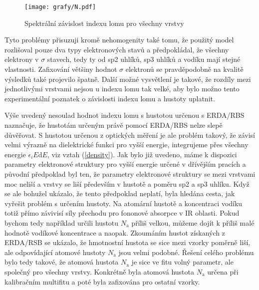 \begin{figure}[tbhp]
	\texttt{[image: grafy/N.pdf]}
	\caption{Spektrální závislost indexu lomu pro všechny vrstvy} 
	\label{index}
\end{figure}

Tyto problémy přisuzuji kromě nehomogenity také tomu, že použitý model rozlišoval pouze dva typy elektronových stavů a předpokládal, že všechny elektrony v $\sigma$ stavech, tedy ty od sp2 uhlíků, sp3 uhlíků a vodíku mají stejné vlastnosti. Zafixování většiny hodnot $\sigma$ elektronů se pravděpodobně na kvalitě výsledků také projevilo špatně. Další možné vysvětlení je takové, že rozdíly mezi jednotlivými vrstvami nejsou u indexu lomu tak velké, aby bylo možno tento experimentální poznatek o závislosti indexu lomu a hustoty uplatnit. 

Výše uvedený nesoulad hodnot indexu lomu s hustotou určenou s ERDA/RBS naznačuje, že hustotám určeným právě pomocí ERDA/RBS nelze slepě důvěřovat. S hustotou určenou z optických měření je ale problém takový, že závisí velmi výrazně na dielektrické funkci pro vyšší energie, integrujeme přes všechny energie $\epsilon_i E \mathrm{d}E$, viz vztah (\ref{density}). 
Jak bylo již uvedeno, máme k dispozici parametry elektronové struktury pro vyšší energie určené v dřívějším pracích a původní předpoklad byl ten, že parametry elektronové struktury se mezi vrstvami moc neliší a vrstvy se liší především v hustotě a poměru sp2 a sp3 uhlíku. Když se ale bohužel ukázalo, že tento předpoklad neplatí, byla hledána cesta, jak vyřešit problém s určením hustoty. Na atomární hustotě a koncentraci vodíku totiž přímo závivisí síly přechodu pro fononové absorpce v IR oblasti. 
Pokud bychom tedy například určili hustotu $N_\mathrm{a}$ příliš velkou, můžeme dojít k příliš malé hodnotě vodíkové koncentrace a naopak. Zkoumáním hustot získaných z ERDA/RSB se ukázalo, že hmotnostní hustota se sice mezi vzorky poměrně liší, ale odpovídající atomové hustoty $N_\mathrm{a}$ jsou velmi podobné. 
Řešení celého problému bylo tedy takové, že atomová hustota $N_\mathrm{a}$ je sice ve fitu volný parametr, ale společný pro všechny vrstvy. Konkrétně byla atomová hustota $N_\mathrm{a}$ určena při kalibračním multifitu a poté byla zafixována pro ostatní vzorky.

